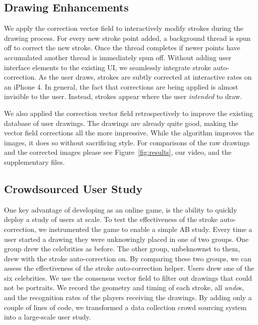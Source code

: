 \subsection {Drawing Enhancements}

We apply the correction vector field to interactively modify strokes during the drawing process. For every new stroke point added, a background thread is spun off to correct the new stroke. Once the thread completes if newer points have accumulated another thread is immediately spun off. Without adding user interface elements to the existing \daf UI, we seamlessly integrate stroke auto-correction. As the user draws, strokes are subtly corrected at interactive rates on an iPhone 4. In general, the fact that corrections are being applied is almost invisible to the user. Instead, strokes appear where the user {\em intended} to draw.


We also applied the correction vector field retrospectively to improve the existing database of user drawings. The drawings are already quite good, making the vector field corrections all the more impressive.  While the algorithm improves the images, it does so without sacrificing style. For comparisons of the raw drawings and the corrected images please see Figure~\ref{fig:results}, our video, and the supplementary files.

\subsection {Crowdsourced User Study}

One key advantage of developing \daf as an online game, is the ability to quickly deploy a study of users at scale. To test the effectiveness of the stroke auto-correction, we instrumented the game to enable a simple AB study. Every time a user started a drawing they were unknowingly placed in one of two groups. One group drew the celebrities as before. The other group, unbeknownst to them, drew with the stroke auto-correction on. By comparing these two groups, we can assess the effectiveness of the stroke auto-correction helper. Users drew one of the six celebrities. We use the consensus vector field to filter out drawings that could not be portraits. We record the geometry and timing of each stroke, all {\em undo}s, and the recognition rates of the players receiving the drawings. By adding only a couple of lines of code, we transformed a data collection crowd sourcing system into a large-scale user study.


